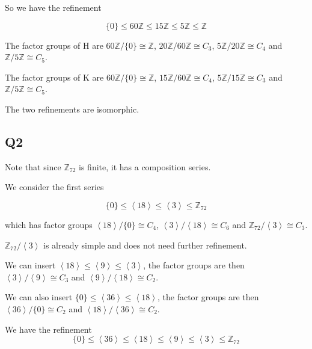 \documentclass{amsart}
\begin{document}
    So we have the refinement

    \[
        \{0\} \leq 60\mathbb{Z} \leq 15\mathbb{Z} \leq 5\mathbb{Z} \leq \mathbb{Z}
    \]

    The factor groups of H are $60\mathbb{Z} / \{0\} \cong \mathbb{Z}$, $20\mathbb{Z} / 60\mathbb{Z} \cong C_3$, $5\mathbb{Z} / 20\mathbb{Z} \cong C_4$ and $\mathbb{Z} / 5\mathbb{Z} \cong C_5$.

    The factor groups of K are $60\mathbb{Z} / \{0\} \cong \mathbb{Z}$, $15\mathbb{Z} / 60\mathbb{Z} \cong C_4$, $5\mathbb{Z} / 15\mathbb{Z} \cong C_3$ and $\mathbb{Z} / 5\mathbb{Z} \cong C_5$.

    The two refinements are isomorphic.

    \subsection*{Q2}

    Note that since $\mathbb{Z}_{72}$ is finite, it has a composition series. 
    
    We consider the first series

    \[\{0\} \leq \left\langle 18 \right\rangle \leq \left\langle 3 \right\rangle \leq \mathbb{Z}_{72}\]

    which has factor groups $\left\langle 18 \right\rangle / \{0\} \cong C_{4}$, $\left\langle 3 \right\rangle / \left\langle 18 \right\rangle \cong C_{6}$ and $\mathbb{Z}_{72} / \left\langle 3 \right\rangle \cong C_{3}$.

    $\mathbb{Z}_{72} / \left\langle 3 \right\rangle$ is already simple and does not need further refinement.
    
    We can insert $\left\langle 18 \right\rangle \leq \left\langle 9 \right\rangle \leq \left\langle 3 \right\rangle$, the factor groups are then $\left\langle 3 \right\rangle / \left\langle 9 \right\rangle \cong C_{3}$ and $\left\langle 9 \right\rangle / \left\langle 18 \right\rangle \cong C_{2}$.

    We can also insert $\{0\} \leq \left\langle 36 \right\rangle \leq \left\langle 18 \right\rangle$, the factor groups are then $\left\langle 36 \right\rangle / \{0\} \cong C_2$ and $\left\langle 18 \right\rangle / \left\langle 36 \right\rangle \cong C_2$.

    We have the refinement 
    \[
        \{0\} \leq \left\langle 36 \right\rangle \leq \left\langle 18 \right\rangle \leq \left\langle 9 \right\rangle \leq \left\langle 3 \right\rangle \leq \mathbb{Z}_{72}
    \]
\end{document}
